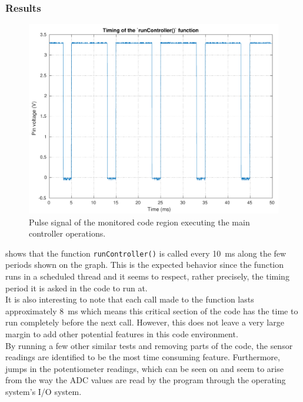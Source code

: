 \subsubsection{Results}
\begin{figure}[H]
  \centering
  \includegraphics[scale=0.6]{figures/programTiming}
  \caption{Pulse signal of the monitored code region executing the main controller operations.}
  \label{fig:programTiming}
\end{figure}
 shows that the function \lstinline{runController()} is called every \SI{10}{ms} along the few periods shown on the graph. This is the expected behavior since the function runs in a scheduled thread and it seems to respect, rather precisely, the timing period it is asked in the code to run at.\\
It is also interesting to note that each call made to the function lasts approximately \SI{8}{ms} which means this critical section of the code has the time to run completely before the next call. However, this does not leave a very large margin to add other potential features in this code environment.\\
By running a few other similar tests and removing parts of the code, the sensor readings are identified to be the most time consuming feature. Furthermore, jumps in the potentiometer readings, which can be seen on  and  seem to arise from the way the ADC values are read by the program through the operating system's I/O system. 
%	
